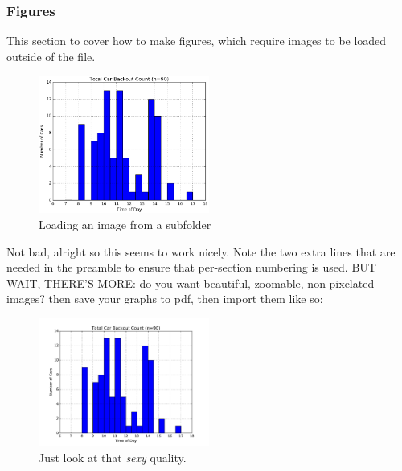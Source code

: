 \documentclass[a4paper,12pt]{article} %
\begin{document}
\newpage
\subsubsection{Figures}
This section to cover how to make figures, which require images to be loaded outside of the file.

\begin{figure}[h] %
\centering
\includegraphics[width=0.5\textwidth]{media/img2.png} %
\caption{Loading an image from a subfolder}
\label{figure-parking}
\end{figure}

Not bad, alright so this seems to work nicely. Note the two extra lines that are needed in the preamble to ensure that per-section numbering is used. BUT WAIT, THERE'S MORE: do you want beautiful, zoomable, non pixelated images? then save your graphs to pdf, then import them like so:
\begin{figure}[h]
\centering
\includegraphics[width=0.5\textwidth]{media/result.pdf}
\caption{Just look at that \textit{sexy} quality.}	
\end{figure}
\end{document}
